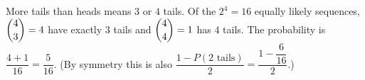More tails than heads means $3$ or $4$ tails. Of the $2^4=16$ equally likely sequences, $\dbinom43=4$ have exactly $3$ tails and $\dbinom44=1$ has $4$ tails. The probability is $\dfrac{4+1}{16}=\boxed{\dfrac{5}{16}}$. (By symmetry this is also $\dfrac{1-P(\text{2 tails})}{2}=\dfrac{1-\dfrac{6}{16}}{2}$.)
